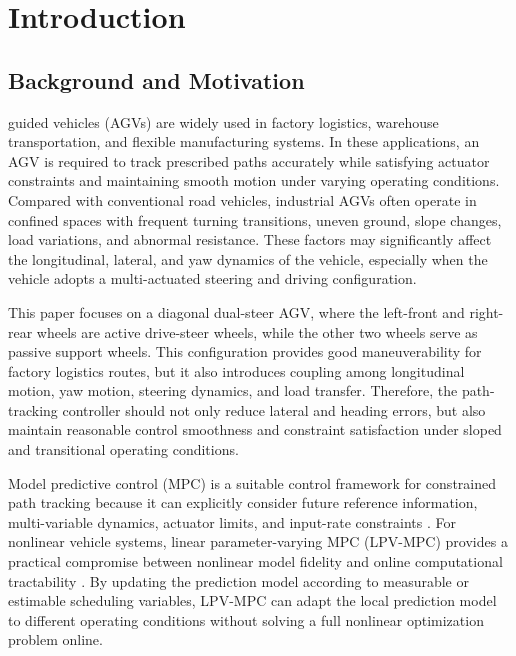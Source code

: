 \documentclass{ieeeaccess}
\newcommand{\citep}[1]{\cite{#1}}
\begin{document}
\titlepgskip=-15pt
\maketitle

\section{Introduction}



\subsection{Background and Motivation}



 guided vehicles (AGVs) are widely used in factory logistics, warehouse transportation, and flexible manufacturing systems. In these applications, an AGV is required to track prescribed paths accurately while satisfying actuator constraints and maintaining smooth motion under varying operating conditions. Compared with conventional road vehicles, industrial AGVs often operate in confined spaces with frequent turning transitions, uneven ground, slope changes, load variations, and abnormal resistance. These factors may significantly affect the longitudinal, lateral, and yaw dynamics of the vehicle, especially when the vehicle adopts a multi-actuated steering and driving configuration.



This paper focuses on a diagonal dual-steer AGV, where the left-front and right-rear wheels are active drive-steer wheels, while the other two wheels serve as passive support wheels. This configuration provides good maneuverability for factory logistics routes, but it also introduces coupling among longitudinal motion, yaw motion, steering dynamics, and load transfer. Therefore, the path-tracking controller should not only reduce lateral and heading errors, but also maintain reasonable control smoothness and constraint satisfaction under sloped and transitional operating conditions.



Model predictive control (MPC) is a suitable control framework for constrained path tracking because it can explicitly consider future reference information, multi-variable dynamics, actuator limits, and input-rate constraints \citep{}. For nonlinear vehicle systems, linear parameter-varying MPC (LPV-MPC) provides a practical compromise between nonlinear model fidelity and online computational tractability \citep{}. By updating the prediction model according to measurable or estimable scheduling variables, LPV-MPC can adapt the local prediction model to different operating conditions without solving a full nonlinear optimization problem online.
\end{document}
